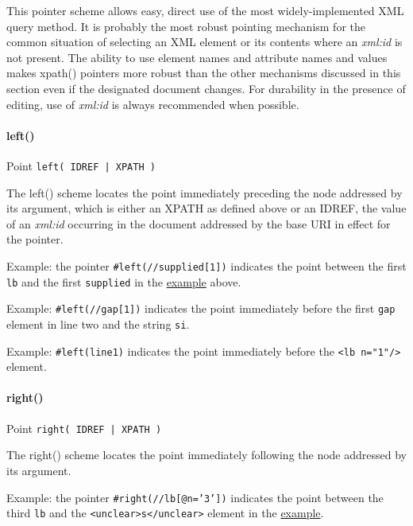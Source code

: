 This pointer scheme allows easy, direct use of the most widely-implemented XML query method. It is probably the most robust pointing mechanism for the common situation of selecting an XML element or its contents where an {\itshape xml:id} is not present. The ability to use element names and attribute names and values makes  {\name xpath()} pointers more robust than the other mechanisms discussed in this section even if the designated document changes. For durability in the presence of editing, use of {\itshape xml:id} is always recommended when possible.
\paragraph[{left()}]{left()}\label{SATSL}\par
Point \texttt{left( IDREF | XPATH )}\par
The  {\name left()} scheme locates the point immediately preceding the node addressed by its argument, which is either an XPATH as defined above or an IDREF, the value of an {\itshape xml:id} occurring in the document addressed by the base URI in effect for the pointer.\par
Example: the pointer \texttt{\#left(//supplied[1])} indicates the point between the first \texttt{lb} and the first \texttt{supplied} in the \hyperref[SATSXP-ex]{example} above.\par
Example: \texttt{\#left(//gap[1])} indicates the point immediately before the first \texttt{gap} element in line two and the string \texttt{si}.\par
Example: \texttt{\#left(line1)} indicates the point immediately before the \texttt{<lb n="1"/>} element.
\paragraph[{right()}]{right()}\label{SATSR}\par
Point \texttt{right( IDREF | XPATH )}\par
The  {\name right()} scheme locates the point immediately following the node addressed by its argument.\par
Example: the pointer \texttt{\#right(//lb[@n='3'])} indicates the point between the third \texttt{lb} and the \texttt{<unclear>s</unclear>} element in the \hyperref[SATSXP-ex]{example}.
